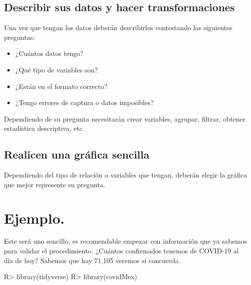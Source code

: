 \documentclass[
]{jss}
\begin{document}
\hypertarget{describir-sus-datos-y-hacer-transformaciones}{%
\subsection{Describir sus datos y hacer
transformaciones}\label{describir-sus-datos-y-hacer-transformaciones}}

Una vez que tengan los datos deberán describirlos contestando las
siguientes preguntas:

\begin{itemize}
\item ¿Cuántos datos tengo?
\item ¿Qué tipo de variables son?
\item ¿Están en el formato correcto?
\item ¿Tengo errores de captura o datos imposibles?
\end{itemize}

Dependiendo de su pregunta necesitarán crear variables, agrupar,
filtrar, obtener estadística descriptiva, etc.

\hypertarget{realicen-una-gruxe1fica-sencilla}{%
\subsection{Realicen una gráfica
sencilla}\label{realicen-una-gruxe1fica-sencilla}}

Dependiendo del tipo de relación o variables que tengan, deberán elegir
la gráfica que mejor represente su pregunta.

\hypertarget{ejemplo.}{%
\section{Ejemplo.}\label{ejemplo.}}

Este será uno sencillo, es recomendable empezar con información que ya
sabemos para validar el procedimiento. ¿Cuántos confirmados tenemos de
COVID-19 al día de hoy? Sabemos que hay 71,105 veremos si concuerda.

\begin{CodeChunk}

\begin{CodeInput}
R> library(tidyverse)
R> library(covidMex)
\end{CodeInput}
\end{CodeChunk}
\end{document}
